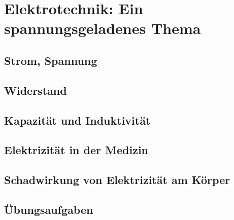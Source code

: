 
\chapter{Elektrotechnik: Ein spannungsgeladenes Thema}
\label{chapter-etech}


\section{Strom, Spannung}
\lipsum[1]
\section{Widerstand}
\lipsum[1]
\section{Kapazität und Induktivität}
\lipsum[1]
\section{Elektrizität in der Medizin}
\lipsum[1]
\section{Schadwirkung von Elektrizität am Körper}
\section{Übungsaufgaben}
\lipsum[1]
